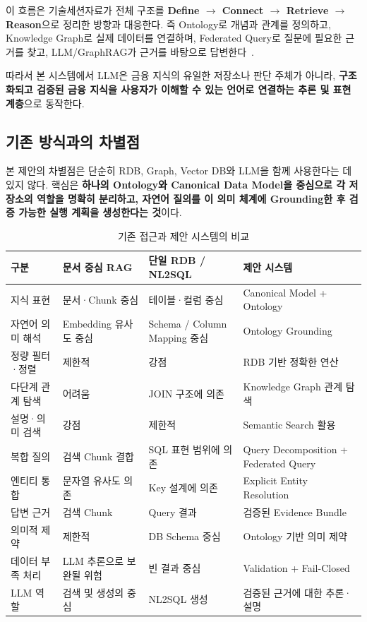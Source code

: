 \documentclass[11pt,a4paper]{article}
\begin{document}
이 흐름은 기술세션자료가 전체 구조를
\textbf{Define $\rightarrow$ Connect $\rightarrow$ Retrieve $\rightarrow$ Reason}으로
정리한 방향과 대응한다.
즉 Ontology로 개념과 관계를 정의하고,
Knowledge Graph로 실제 데이터를 연결하며,
Federated Query로 질문에 필요한 근거를 찾고,
LLM/GraphRAG가 근거를 바탕으로 답변한다~\cite[24쪽]{mirae-tech}.

따라서 본 시스템에서 LLM은 금융 지식의 유일한 저장소나 판단 주체가 아니라,
\textbf{구조화되고 검증된 금융 지식을 사용자가 이해할 수 있는 언어로 연결하는 추론 및 표현 계층}으로 동작한다.

\subsection{기존 방식과의 차별점}

본 제안의 차별점은 단순히 RDB, Graph, Vector DB와 LLM을 함께 사용한다는 데 있지 않다.
핵심은
\textbf{하나의 Ontology와 Canonical Data Model을 중심으로 각 저장소의 역할을 명확히 분리하고,
자연어 질의를 이 의미 체계에 Grounding한 후 검증 가능한 실행 계획을 생성한다는 것}이다.

\begin{table}[htbp]
\centering
\caption{기존 접근과 제안 시스템의 비교}
\small
\begin{tabularx}{\textwidth}{
>{\raggedright\arraybackslash}p{}
>{\raggedright\arraybackslash}X
>{\raggedright\arraybackslash}X
>{\raggedright\arraybackslash}X}
\toprule
\textbf{구분} & \textbf{문서 중심 RAG} & \textbf{단일 RDB / NL2SQL} & \textbf{제안 시스템} \\
\midrule
지식 표현 & 문서·Chunk 중심 & 테이블·컬럼 중심 & Canonical Model + Ontology \\
자연어 의미 해석 & Embedding 유사도 중심 & Schema / Column Mapping 중심 & Ontology Grounding \\
정량 필터·정렬 & 제한적 & 강점 & RDB 기반 정확한 연산 \\
다단계 관계 탐색 & 어려움 & JOIN 구조에 의존 & Knowledge Graph 관계 탐색 \\
설명·의미 검색 & 강점 & 제한적 & Semantic Search 활용 \\
복합 질의 & 검색 Chunk 결합 & SQL 표현 범위에 의존 & Query Decomposition + Federated Query \\
엔티티 통합 & 문자열 유사도 의존 & Key 설계에 의존 & Explicit Entity Resolution \\
답변 근거 & 검색 Chunk & Query 결과 & 검증된 Evidence Bundle \\
의미적 제약 & 제한적 & DB Schema 중심 & Ontology 기반 의미 제약 \\
데이터 부족 처리 & LLM 추론으로 보완될 위험 & 빈 결과 중심 & Validation + Fail-Closed \\
LLM 역할 & 검색 및 생성의 중심 & NL2SQL 생성 & 검증된 근거에 대한 추론·설명 \\
\bottomrule
\end{tabularx}
\end{table}
\end{document}
